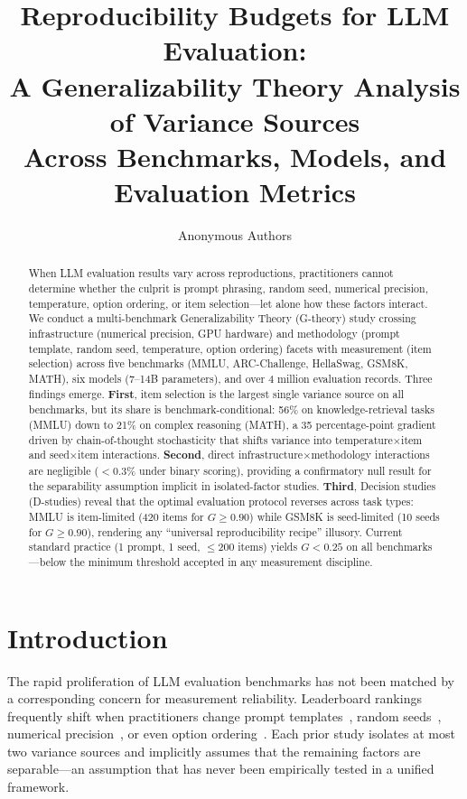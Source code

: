 \documentclass[11pt]{article}
\title{Reproducibility Budgets for LLM Evaluation:\\
A Generalizability Theory Analysis of Variance Sources\\Across Benchmarks, Models, and Evaluation Metrics}
\author{Anonymous Authors}
\date{}
\begin{document}
\maketitle

\begin{abstract}
When LLM evaluation results vary across reproductions, practitioners cannot determine whether the culprit is prompt phrasing, random seed, numerical precision, temperature, option ordering, or item selection---let alone how these factors interact.
We conduct a multi-benchmark Generalizability Theory (G-theory) study crossing infrastructure (numerical precision, GPU hardware) and methodology (prompt template, random seed, temperature, option ordering) facets with measurement (item selection) across five benchmarks (MMLU, ARC-Challenge, HellaSwag, GSM8K, MATH), six models (7--14B parameters), and over 4 million evaluation records.
Three findings emerge.
\textbf{First}, item selection is the largest single variance source on all benchmarks, but its share is benchmark-conditional: 56\% on knowledge-retrieval tasks (MMLU) down to 21\% on complex reasoning (MATH), a 35 percentage-point gradient driven by chain-of-thought stochasticity that shifts variance into temperature$\times$item and seed$\times$item interactions.
\textbf{Second}, direct infrastructure$\times$methodology interactions are negligible ($<$0.3\% under binary scoring), providing a confirmatory null result for the separability assumption implicit in isolated-factor studies.
\textbf{Third}, Decision studies (D-studies) reveal that the optimal evaluation protocol reverses across task types: MMLU is item-limited (420 items for $G \geq 0.90$) while GSM8K is seed-limited (10 seeds for $G \geq 0.90$), rendering any ``universal reproducibility recipe'' illusory.
Current standard practice (1 prompt, 1 seed, $\leq$200 items) yields $G < 0.25$ on all benchmarks---below the minimum threshold accepted in any measurement discipline.
\end{abstract}

\section{Introduction}

The rapid proliferation of LLM evaluation benchmarks has not been matched by a corresponding concern for measurement reliability.
Leaderboard rankings frequently shift when practitioners change prompt templates~\citep{mizrahi2024state,sclar2024quantifying}, random seeds~\citep{pezeshkpour2024large}, numerical precision~\citep{yuan2025revisiting}, or even option ordering~\citep{lu2022fantastically,pezeshkpour2024ordering}.
Each prior study isolates at most two variance sources and implicitly assumes that the remaining factors are separable---an assumption that has never been empirically tested in a unified framework.
\end{document}
